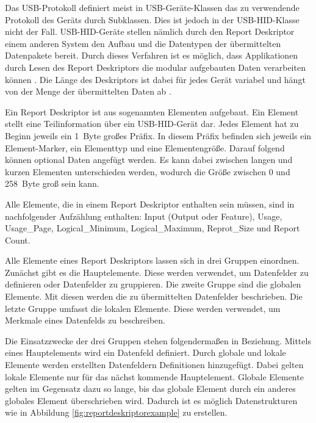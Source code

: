 Das USB-Protokoll definiert meist in USB-Geräte-Klassen das zu verwendende Protokoll des Geräts durch Subklassen. Dies ist jedoch in der USB-\acs{HID}-Klasse nicht der Fall. USB-\acs{HID}-Geräte stellen nämlich durch den Report Deskriptor einem anderen System den Aufbau und die Datentypen der übermittelten Datenpakete bereit. \cite[S.~8]{usbHIDS} Durch dieses Verfahren ist es möglich, dass Applikationen durch Lesen des Report Deskriptors die modular aufgebauten Daten verarbeiten können \cite[S.~24]{usbHIDS}. Die Länge des Deskriptors ist dabei für jedes Gerät variabel und hängt von der Menge der übermittelten Daten ab \cite[S.~23]{usbHIDS}.

Ein Report Deskriptor ist aus sogenannten Elementen aufgebaut. Ein Element stellt eine Teilinformation über ein USB-\acs{HID}-Gerät dar. Jedes Element hat zu Beginn jeweils ein 1~Byte großes Präfix. In diesem Präfix befinden sich jeweils ein Element-Marker, ein Elementtyp und eine Elementengröße. Darauf folgend können optional Daten angefügt werden. Es kann dabei zwischen langen und kurzen Elementen unterschieden werden, wodurch die Größe zwischen 0 und 258~Byte groß sein kann. \cite[S.~14]{usbHIDS}

Alle Elemente, die in einem Report Deskriptor enthalten sein müssen, sind in nachfolgender Aufzählung enthalten: Input (Output oder Feature), Usage, Usage\_Page, Logical\_Minimum, Logical\_Maximum, Reprot\_Size und Report Count. \cite[S.~24]{usbHIDS}

Alle Elemente eines Report Deskriptors lassen sich in drei Gruppen einordnen. Zunächst gibt es die Hauptelemente. Diese werden verwendet, um Datenfelder zu definieren oder Datenfelder zu gruppieren. Die zweite Gruppe sind die globalen Elemente. Mit diesen werden die zu übermittelten Datenfelder beschrieben. Die letzte Gruppe umfasst die lokalen Elemente. Diese werden verwendet, um Merkmale eines Datenfelds zu beschreiben. \cite[S.~16, S.~28, S.~35]{usbHIDS}

Die Einsatzzwecke der drei Gruppen stehen folgendermaßen in Beziehung. Mittels eines Hauptelements wird ein Datenfeld definiert. Durch globale und lokale Elemente werden erstellten Datenfeldern Definitionen hinzugefügt. Dabei gelten lokale Elemente nur für das nächst kommende Hauptelement. Globale Elemente gelten im Gegensatz dazu so lange, bis das globale Element durch ein anderes globales Element überschrieben wird. Dadurch ist es möglich Datenstrukturen wie in Abbildung \ref{fig:reportdeskriptorexample} zu erstellen. \cite[S.~24]{usbHIDS}

